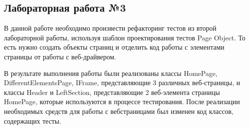 \documentclass[a4paper]{article}
\begin{document}
    \subsection{Лабораторная работа №3}
    В данной работе необходимо произвести рефакторинг тестов из второй лабораторной работы, используя шаблон проектирования тестов Page Object. То есть нужно создать объекты страниц и отделить код работы с элементами страницы от работы с веб-драйвером. \par
    В результате выполнения работы были реализованы классы HomePage, DifferentElementsPage, IFrame, представляющие 3 различных веб-страницы, и классы Header и LeftSection, представляющие 2 веб-элемента страницы HomePage, которые используются в процессе тестирования. После реализации необходимых средств для работы с вебстраницами был изменен код классов, содержащих тесты.
\end{document}
